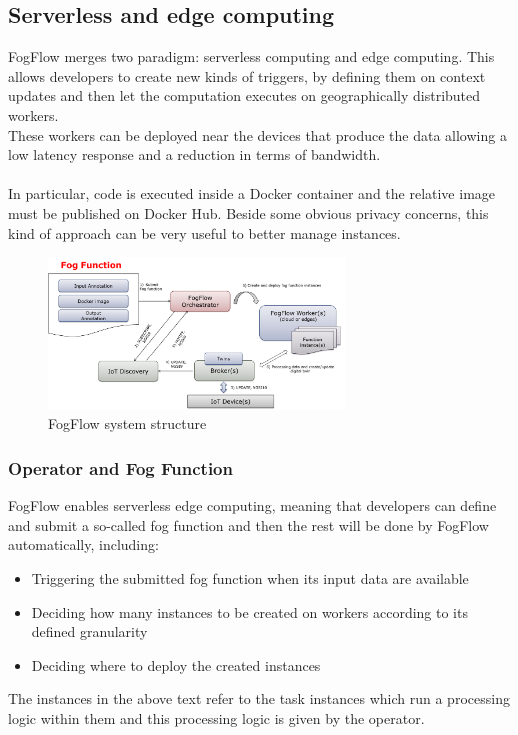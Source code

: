 \documentclass[a4paper]{article}
\begin{document}
\subsection{Serverless and edge computing}
FogFlow merges two paradigm: serverless computing and edge computing. This allows developers to create new kinds of triggers, by defining them on context updates and then let the computation executes on geographically distributed workers.\\
These workers can be deployed near the devices that produce the data allowing a low latency response and a reduction in terms of bandwidth.\\\\
In particular, code is executed inside a Docker container and the relative image must be published on Docker Hub. Beside some obvious privacy concerns, this kind of approach can be very useful to better manage instances.
\begin{figure}[H]
    \centering
    \includegraphics[width=0.7\textwidth]{Images/function-orchestration.png}
    \caption{FogFlow system structure}
\end{figure}{}

\subsubsection{Operator and Fog Function}
FogFlow enables serverless edge computing, meaning that developers can define and submit a so-called fog function and then the rest will be done by FogFlow automatically, including:
\begin{itemize}
    \item Triggering the submitted fog function when its input data are available
    \item Deciding how many instances to be created on workers according to its defined granularity
    \item Deciding where to deploy the created instances
\end{itemize}{}
The instances in the above text refer to the task instances which run a processing logic within them and this processing logic is given by the operator.
\end{document}
